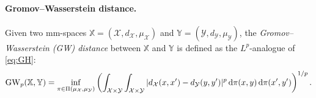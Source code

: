         \paragraph{Gromov--Wasserstein distance.} Given two mm-spaces $\mathbb{X}=(\mathcal{X},d_{\mathcal{X}},\mu_{\mathcal{X}})$ and $\mathbb{Y}=(\mathcal{Y},d_{\mathcal{Y}},\mu_{\mathcal{Y}})$, the \emph{Gromov--Wasserstein (GW) distance} between $\mathbb{X}$ and $\mathbb{Y}$ is defined as the $L^p$-analogue of \cref{eq:GH}:
        \begin{align*}
            \operatorname{GW}_p(\mathbb{X},\mathbb{Y})=\inf_{\pi \in \Pi(\mu_{\mathcal{X}},\mu_{\mathcal{Y}})} \left( \int _{\mathcal{X}\times \mathcal{Y}}\int _{\mathcal{X}\times \mathcal{Y}}|d_{\mathcal{X}}(x,x')-d_{\mathcal{Y}}(y,y')|^p \, \mathrm d\pi(x,y)\, \mathrm d\pi(x',y')\right)^{1/p}.
        \end{align*}

